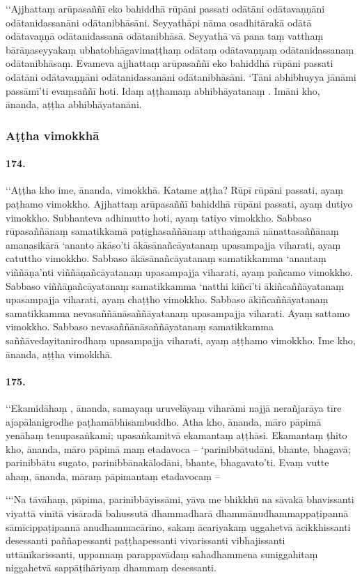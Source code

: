 ‘‘Ajjhattaṃ arūpasaññī eko bahiddhā rūpāni passati odātāni odātavaṇṇāni odātanidassanāni odātanibhāsāni. Seyyathāpi nāma osadhitārakā odātā odātavaṇṇā odātanidassanā odātanibhāsā. Seyyathā vā pana taṃ vatthaṃ bārāṇaseyyakaṃ ubhatobhāgavimaṭṭhaṃ odātaṃ odātavaṇṇaṃ odātanidassanaṃ odātanibhāsaṃ. Evameva ajjhattaṃ arūpasaññī eko bahiddhā rūpāni passati odātāni odātavaṇṇāni odātanidassanāni odātanibhāsāni. ‘Tāni abhibhuyya jānāmi passāmī’ti evaṃsaññī hoti. Idaṃ aṭṭhamaṃ abhibhāyatanaṃ . Imāni kho, ānanda, aṭṭha abhibhāyatanāni.

\subsubsection{Aṭṭha vimokkhā}

\paragraph{174.} ‘‘Aṭṭha kho ime, ānanda, vimokkhā. Katame aṭṭha? Rūpī rūpāni passati, ayaṃ paṭhamo vimokkho. Ajjhattaṃ arūpasaññī bahiddhā rūpāni passati, ayaṃ dutiyo vimokkho. Subhanteva adhimutto hoti, ayaṃ tatiyo vimokkho. Sabbaso rūpasaññānaṃ samatikkamā paṭighasaññānaṃ atthaṅgamā nānattasaññānaṃ amanasikārā ‘ananto ākāso’ti ākāsānañcāyatanaṃ upasampajja viharati, ayaṃ catuttho vimokkho. Sabbaso ākāsānañcāyatanaṃ samatikkamma ‘anantaṃ viññāṇa’nti viññāṇañcāyatanaṃ upasampajja viharati, ayaṃ pañcamo vimokkho. Sabbaso viññāṇañcāyatanaṃ samatikkamma ‘natthi kiñcī’ti ākiñcaññāyatanaṃ upasampajja viharati, ayaṃ chaṭṭho vimokkho. Sabbaso ākiñcaññāyatanaṃ samatikkamma nevasaññānāsaññāyatanaṃ upasampajja viharati. Ayaṃ sattamo vimokkho. Sabbaso nevasaññānāsaññāyatanaṃ samatikkamma saññāvedayitanirodhaṃ upasampajja viharati, ayaṃ aṭṭhamo vimokkho. Ime kho, ānanda, aṭṭha vimokkhā.

\paragraph{175.} ‘‘Ekamidāhaṃ , ānanda, samayaṃ uruvelāyaṃ viharāmi najjā nerañjarāya tīre ajapālanigrodhe paṭhamābhisambuddho. Atha kho, ānanda, māro pāpimā yenāhaṃ tenupasaṅkami; upasaṅkamitvā ekamantaṃ aṭṭhāsi. Ekamantaṃ ṭhito kho, ānanda, māro pāpimā maṃ etadavoca – ‘parinibbātudāni, bhante, bhagavā; parinibbātu sugato, parinibbānakālodāni, bhante, bhagavato’ti. Evaṃ vutte ahaṃ, ānanda, māraṃ pāpimantaṃ etadavocaṃ –

‘‘‘Na tāvāhaṃ, pāpima, parinibbāyissāmi, yāva me bhikkhū na sāvakā bhavissanti viyattā vinītā visāradā bahussutā dhammadharā dhammānudhammappaṭipannā sāmīcippaṭipannā anudhammacārino, sakaṃ ācariyakaṃ uggahetvā ācikkhissanti desessanti paññapessanti paṭṭhapessanti vivarissanti vibhajissanti uttānīkarissanti, uppannaṃ parappavādaṃ sahadhammena suniggahitaṃ niggahetvā sappāṭihāriyaṃ dhammaṃ desessanti.

